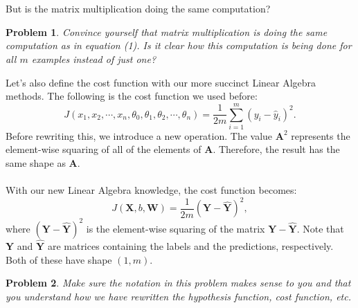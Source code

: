 \documentclass{article}
\newtheorem*{problem}{Problem}
\begin{document}
\\
\\
But is the matrix multiplication doing the same computation?
\begin{problem}
Convince yourself that matrix multiplication is doing the same computation as in equation (1). Is it clear how this computation is being done for all $m$ examples instead of just one?
\end{problem}
\noindent Let's also define the cost function with our more succinct Linear Algebra methods. The following is the cost function we used before:
\[J(x_1,x_2,\cdots,x_n,\theta_0,\theta_1,\theta_2,\cdots,\theta_n)=\frac{1}{2m}\sum_{i=1} ^{m} (y_i-\hat{y}_i)^2.\]
Before rewriting this, we introduce a new operation. The value $\textbf{A}^2$ represents the element-wise squaring of all of the elements of \textbf{A}. Therefore, the result has the same shape as $\textbf{A}$. 
\\
\\
With our new Linear Algebra knowledge, the cost function becomes:
\[J(\textbf{X},b,\textbf{W})=\frac{1}{2m} (\textbf{Y}-\hat{\textbf{Y}})^2,\]
where $(\textbf{Y}-\hat{\textbf{Y}})^2$ is the element-wise squaring of the matrix $\textbf{Y}-\hat{\textbf{Y}}$. Note that \textbf{Y} and $\hat{\textbf{Y}}$ are matrices containing the labels and the predictions, respectively. Both of these have shape $(1,m)$.
\begin{problem}
Make sure the notation in this problem makes sense to you and that you understand how we have rewritten the hypothesis function, cost function, etc.
\end{problem}
\end{document}

